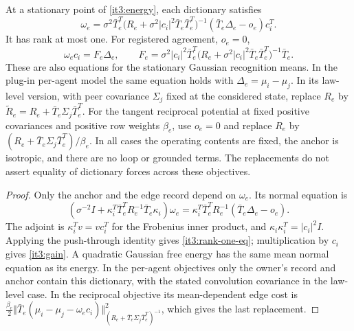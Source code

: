 \documentclass[11pt,letterpaper]{report}
\begin{document}
At a stationary point of \cref{it3:energy}, each dictionary satisfies
\begin{equation}
\omega_e=\sigma^2\bar T_e^T
\bigl(R_e+\sigma^2|c_i|^2\bar T_e\bar T_e^T\bigr)^{-1}
(\bar T_e\Delta_e-o_e)c_i^T.
\label{it3:rank-one-eq}
\end{equation}
It has rank at most one. For registered agreement, $o_e=0$,
\begin{equation}
\omega_ec_i=F_e\Delta_e,\qquad
F_e=\sigma^2|c_i|^2\bar T_e^T
\bigl(R_e+\sigma^2|c_i|^2\bar T_e\bar T_e^T\bigr)^{-1}\bar T_e.
\label{it3:gain}
\end{equation}
These are also equations for the stationary Gaussian recognition means. In the plug-in per-agent model the same equation holds with $\Delta_e=\mu_i-\mu_j$. In its law-level version, with peer covariance $\Sigma_j$ fixed at the considered state, replace $R_e$ by $\widetilde R_e=R_e+\bar T_e\Sigma_j\bar T_e^T$. For the tangent reciprocal potential at fixed positive covariances and positive row weights $\beta_e$, use $o_e=0$ and replace $R_e$ by $(R_e+\bar T_e\Sigma_j\bar T_e^T)/\beta_e$. In all cases the operating contents are fixed, the anchor is isotropic, and there are no loop or grounded terms. The replacements do not assert equality of dictionary forces across these objectives.
\begin{proof}
Only the anchor and the edge record depend on $\omega_e$. Its normal equation is
\begin{equation}
(\sigma^{-2}I+\kappa_i^T\bar T_e^TR_e^{-1}\bar T_e\kappa_i)\omega_e
=\kappa_i^T\bar T_e^TR_e^{-1}(\bar T_e\Delta_e-o_e).
\end{equation}
The adjoint is $\kappa_i^Tv=vc_i^T$ for the Frobenius inner product, and $\kappa_i\kappa_i^T=|c_i|^2I$. Applying the push-through identity gives \cref{it3:rank-one-eq}; multiplication by $c_i$ gives \cref{it3:gain}. A quadratic Gaussian free energy has the same mean normal equation as its energy. In the per-agent objectives only the owner's record and anchor contain this dictionary, with the stated convolution covariance in the law-level case. In the reciprocal objective its mean-dependent edge cost is $\frac{\beta_e}{2}\Vert\bar T_e(\mu_i-\mu_j-\omega_ec_i)\Vert_{(R_e+\bar T_e\Sigma_j\bar T_e^T)^{-1}}^2$, which gives the last replacement.
\end{proof}
\end{document}
